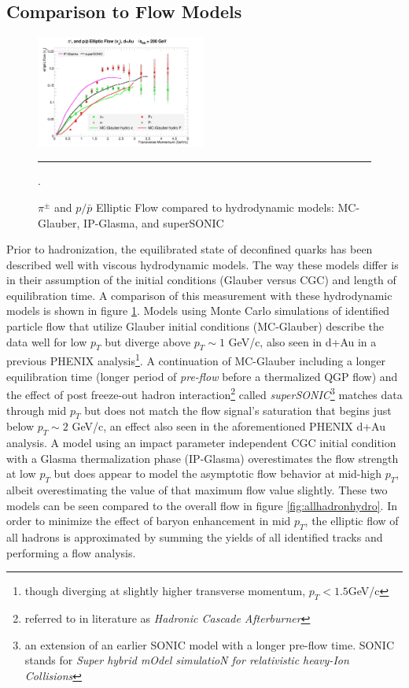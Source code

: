 \subsection{Comparison to Flow Models}
\begin{figure}[hbtp]
\centering    
    \includegraphics[width=0.5\textwidth]{results/v2allpipmodels.jpg}
    \rule{35em}{0.5pt}
    \caption[$\pi^{\pm}$ and $p/\bar{p}$ Elliptic Flow compared to hydrodynamic models.]{$\pi^{\pm}$ and $p/\bar{p}$ Elliptic Flow compared to hydrodynamic models: MC-Glauber\citep{Nagle:2013lja}, IP-Glasma\citep{Schenke:2014gaa}, and superSONIC\citep{Romatschke2015}}.
    \label{fig:hydrov2}
\end{figure}

Prior to hadronization, the equilibrated state of deconfined quarks has been described well with viscous hydrodynamic models. The way these models differ is in their assumption of the initial conditions (Glauber versus CGC) and length of equilibration time. A comparison of this measurement with these hydrodynamic models is shown in figure \ref{fig:hydrov2}. Models using Monte Carlo simulations of identified particle flow that utilize Glauber initial conditions (MC-Glauber) describe the data well for low $p_T$ but diverge above $p_T \sim 1$ GeV/c, also seen in d+Au in a previous PHENIX analysis\citep{Adare:2014keg}\footnote{though diverging at slightly higher transverse momentum, $p_T < 1.5 $GeV/c}. A continuation of MC-Glauber including a longer equilibration time (longer period of \textit{pre-flow} before a thermalized QGP flow) and the effect of post freeze-out hadron interaction\footnote{referred to in literature as \textit{Hadronic Cascade Afterburner}} called \textit{superSONIC}\citep{Romatschke2015}\footnote{an extension of an earlier SONIC model with a longer pre-flow time. SONIC stands for \textit{Super hybrid mOdel simulatioN for relativistic heavy-Ion Collisions}\citep{Romatschke2015}} matches data through mid $p_T$ but does not match the flow signal's saturation that begins just below $p_T \sim 2$ GeV/c, an effect also seen in the aforementioned PHENIX d+Au analysis. A model using an impact parameter independent CGC initial condition with a Glasma thermalization phase (IP-Glasma)\citep{Schenke:2014gaa} overestimates the flow strength at low $p_T$ but does appear to model the asymptotic flow behavior at mid-high $p_T$, albeit overestimating the value of that maximum flow value slightly. These two models can be seen compared to the overall flow in figure \ref{fig:allhadronhydro}. In order to minimize the effect of baryon enhancement in mid $p_T$, the elliptic flow of all hadrons is approximated by summing the yields of all identified tracks and performing a flow analysis. 

